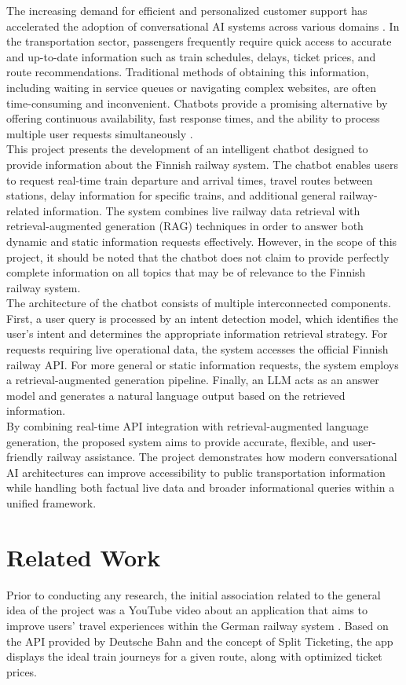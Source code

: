 \documentclass[fleqn,moreauthors,10pt]{ds_report}
\begin{document}
The increasing demand for efficient and personalized customer support has accelerated the adoption of conversational AI systems across various domains \cite{Banu.2025}. In the transportation sector, passengers frequently require quick access to accurate and up-to-date information such as train schedules, delays, ticket prices, and route recommendations. Traditional methods of obtaining this information, including waiting in service queues or navigating complex websites, are often time-consuming and inconvenient. Chatbots provide a promising alternative by offering continuous availability, fast response times, and the ability to process multiple user requests simultaneously \cite{Banu.2025}. \\
This project presents the development of an intelligent chatbot designed to provide information about the Finnish railway system. The chatbot enables users to request real-time train departure and arrival times, travel routes between stations, delay information for specific trains, and additional general railway-related information. The system combines live railway data retrieval with retrieval-augmented generation (RAG) techniques in order to answer both dynamic and static information requests effectively. However, in the scope of this project, it should be noted that the chatbot does not claim to provide perfectly complete information on all topics that may be of relevance to the Finnish railway system. \\
The architecture of the chatbot consists of multiple interconnected components. First, a user query is processed by an intent detection model, which identifies the user’s intent and determines the appropriate information retrieval strategy. For requests requiring live operational data, the system accesses the official Finnish railway API. For more general or static information requests, the system employs a retrieval-augmented generation pipeline. Finally, an LLM acts as an answer model and generates a natural language output based on the retrieved information. \\
By combining real-time API integration with retrieval-augmented language generation, the proposed system aims to provide accurate, flexible, and user-friendly railway assistance. The project demonstrates how modern conversational AI architectures can improve accessibility to public transportation information while handling both factual live data and broader informational queries within a unified framework.


\section*{Related Work}
Prior to conducting any research, the initial association related to the general idea of the project was a YouTube video about an application that aims to improve users' travel experiences within the German railway system \cite{noauthor_betterbahnbetterbahn_2026}. Based on the API provided by Deutsche Bahn and the concept of Split Ticketing, the app displays the ideal train journeys for a given route, along with optimized ticket prices. 
\end{document}
